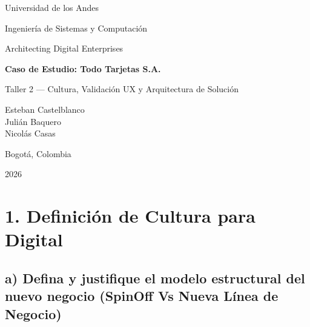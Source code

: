 \documentclass[12pt,letterpaper]{article}
\begin{document}
\begin{titlepage}
    \centering
    \vspace*{2cm}
    
    {\large Universidad de los Andes \par}
    \vspace{0.3cm}
    {\large Ingeniería de Sistemas y Computación \par}
    \vspace{0.3cm}
    {\large Architecting Digital Enterprises \par}
    
    \vspace{2.5cm}
    
    {\LARGE \textbf{Caso de Estudio: Todo Tarjetas S.A.} \par}
    \vspace{0.8cm}
    {\Large Taller 2 --- Cultura, Validación UX y Arquitectura de Solución \par}
    
    \vspace{3cm}
    
    {\large
        Esteban Castelblanco \\[0.3cm]
        Julián Baquero \\[0.3cm]
        Nicolás Casas \par
    }
    
    \vfill
    
    {\large Bogotá, Colombia \par}
    \vspace{0.3cm}
    {\large 2026 \par}
    
    \vspace{2cm}
\end{titlepage}


\section*{1. Definición de Cultura para Digital}

\subsection*{a)  Defina y justifique el modelo estructural del nuevo negocio (SpinOff Vs Nueva Línea de Negocio)  }
\end{document}
